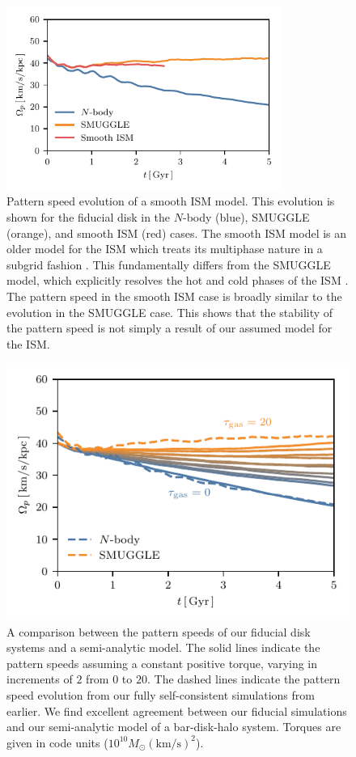 \documentclass[twocolumn,linenumbers]{aastex631}
\newcommand{\kms}{\ensuremath{\textrm{km}/\textrm{s}}}
\newcommand{\Nbody}{$N$-body}
\newcommand{\SMUGGLE}{SMUGGLE}
\newcommand{\Msun}{\ensuremath{M_{\odot}}}
\begin{document}
\begin{figure}
    \centering
    \includegraphics[width=9cm]{fig/ps_GFM.pdf}
    \caption{Pattern speed evolution of a smooth ISM model. This evolution is
    shown for the fiducial disk in the \Nbody{} (blue), \SMUGGLE{} (orange), and
    smooth ISM (red) cases. The smooth ISM model is an older model for the ISM
    which treats its multiphase nature in a subgrid fashion
    \citep{2003MNRAS.339..289S}. This fundamentally differs from the \SMUGGLE{}
    model, which explicitly resolves the hot and cold phases of the ISM
    \citep{2019MNRAS.489.4233M}. The pattern speed in the smooth ISM case is
    broadly similar to the evolution in the \SMUGGLE{} case. This shows that the
    stability of the pattern speed is not simply a result of our assumed model
    for the ISM.}
\label{fig:GFM}
\end{figure}

\begin{figure}
    \centering
    \includegraphics[width=\columnwidth]{fig/samGvar.pdf}
    \caption{A comparison between the pattern speeds of our fiducial disk
    systems and a semi-analytic model. The solid lines indicate the pattern
    speeds assuming a constant positive torque, varying in increments of $2$
    from $0$ to $20$. The dashed lines indicate the pattern speed evolution from
    our fully self-consistent simulations from earlier. We find excellent
    agreement between our fiducial simulations and our semi-analytic model of a
    bar-disk-halo system. Torques are given in code units ($10^{10}\Msun
    \left(\kms\right)^2$).}
    \label{fig:sam}
\end{figure}
\end{document}

